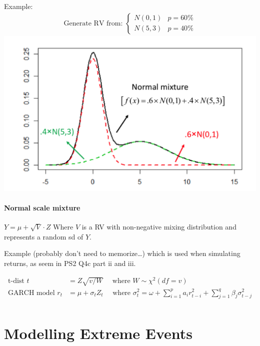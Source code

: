 \documentclass[
  oneside]{book}
\begin{document}
Example:
\[
\begin{aligned}
\text{Generate RV from: } \begin{cases}
N(0,1) & p=60\%\\
N(5,3) & p=40\%
\end{cases}
\end{aligned}
\]
\includegraphics{Notes/Obsidian-Attachments/2-Return-Distributions-4.png}

\hypertarget{normal-scale-mixture}{%
\subsubsection{Normal scale mixture}\label{normal-scale-mixture}}

\(Y = \mu+\sqrt{ V } \cdot Z\)
Where \(V\) is a RV with non-negative mixing distribution and represents a random sd of \(Y\).

Example (probably don't need to memorize\ldots) which is used when simulating returns, as seem in PS2 Q4c part ii and iii.

\[
\begin{aligned}
\text{t-dist } t &= Z\sqrt{ v/W } \quad \text{ where } W \sim \chi^{2}(df=v)\\
\text{GARCH model } r_{t} &= \mu + \sigma_{t}Z_{t} \quad \text{ where } \sigma^{2}_{t} = \omega + \sum^{p}_{i=1}a_{i}r^{2}_{t-i}+\sum^{q}_{j=1}\beta_{j}\sigma^{2}_{t-j}\\
\end{aligned}
\]

\hypertarget{modelling-extreme-events}{%
\chapter{Modelling Extreme Events}\label{modelling-extreme-events}}
\end{document}
